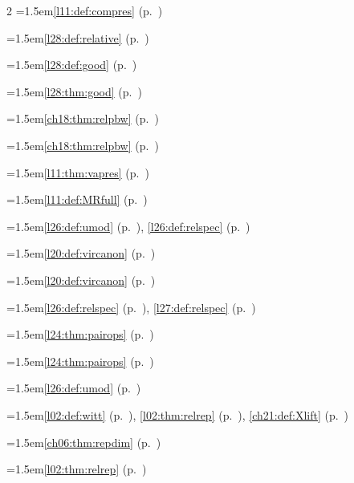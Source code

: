 \begin{multicols}{2}
\hangindent=1.5em\quad \ref{l11:def:compres} (p.~\pageref{l11:def:compres})\par
\hangindent=1.5em\quad \ref{l28:def:relative} (p.~\pageref{l28:def:relative})\par
\hangindent=1.5em\quad \ref{l28:def:good} (p.~\pageref{l28:def:good})\par
\hangindent=1.5em\quad \ref{l28:thm:good} (p.~\pageref{l28:thm:good})\par
\hangindent=1.5em\quad \ref{ch18:thm:relpbw} (p.~\pageref{ch18:thm:relpbw})\par
\hangindent=1.5em\quad \ref{ch18:thm:relpbw} (p.~\pageref{ch18:thm:relpbw})\par
\hangindent=1.5em\quad \ref{l11:thm:vapres} (p.~\pageref{l11:thm:vapres})\par
\hangindent=1.5em\quad \ref{l11:def:MRfull} (p.~\pageref{l11:def:MRfull})\par
\hangindent=1.5em\quad \ref{l26:def:umod} (p.~\pageref{l26:def:umod}), \ref{l26:def:relspec} (p.~\pageref{l26:def:relspec})\par
\hangindent=1.5em\quad \ref{l20:def:vircanon} (p.~\pageref{l20:def:vircanon})\par
\hangindent=1.5em\quad \ref{l20:def:vircanon} (p.~\pageref{l20:def:vircanon})\par
\hangindent=1.5em\quad \ref{l26:def:relspec} (p.~\pageref{l26:def:relspec}), \ref{l27:def:relspec} (p.~\pageref{l27:def:relspec})\par
\hangindent=1.5em\quad \ref{l24:thm:pairops} (p.~\pageref{l24:thm:pairops})\par
\hangindent=1.5em\quad \ref{l24:thm:pairops} (p.~\pageref{l24:thm:pairops})\par
\hangindent=1.5em\quad \ref{l26:def:umod} (p.~\pageref{l26:def:umod})\par
\hangindent=1.5em\quad \ref{l02:def:witt} (p.~\pageref{l02:def:witt}), \ref{l02:thm:relrep} (p.~\pageref{l02:thm:relrep}), \ref{ch21:def:Xlift} (p.~\pageref{ch21:def:Xlift})\par
\hangindent=1.5em\quad \ref{ch06:thm:repdim} (p.~\pageref{ch06:thm:repdim})\par
\hangindent=1.5em\quad \ref{l02:thm:relrep} (p.~\pageref{l02:thm:relrep})\par

\end{multicols}
